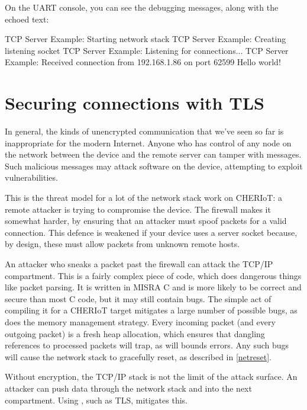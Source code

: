 
On the UART console, you can see the debugging messages, along with the echoed text:

\begin{console}
TCP Server Example: Starting network stack
TCP Server Example: Creating listening socket
TCP Server Example: Listening for connections...
TCP Server Example: Received connection from 192.168.1.86 on port 62599
Hello world!
\end{console}


\section{Securing connections with TLS}

In general, the kinds of unencrypted communication that we've seen so far is inappropriate for the modern Internet.
Anyone who has control of any node on the network between the device and the remote server can tamper with messages.
Such malicious messages may attack software on the device, attempting to exploit vulnerabilities.

This is the threat model for a lot of the network stack work on CHERIoT: a remote attacker is trying to compromise the device.
The firewall makes it somewhat harder, by ensuring that an attacker must spoof packets for a valid connection.
This defence is weakened if your device uses a server socket because, by design, these must allow packets from unknown remote hosts.

An attacker who sneaks a packet past the firewall can attack the TCP/IP compartment.
This is a fairly complex piece of code, which does dangerous things like packet parsing.
It is written in MISRA C and is more likely to be correct and secure than most C code, but it may still contain bugs.
The simple act of compiling it for a CHERIoT target mitigates a large number of possible bugs, as does the memory management strategy.
Every incoming packet (and every outgoing packet) is a fresh heap allocation, which ensures that dangling references to processed packets will trap, as will bounds errors.
Any such bugs will cause the network stack to gracefully reset, as described in \ref{netreset}.

Without encryption, the TCP/IP stack is not the limit of the attack surface.
An attacker can push data through the network stack and into the next compartment.
Using , such as TLS, mitigates this.

